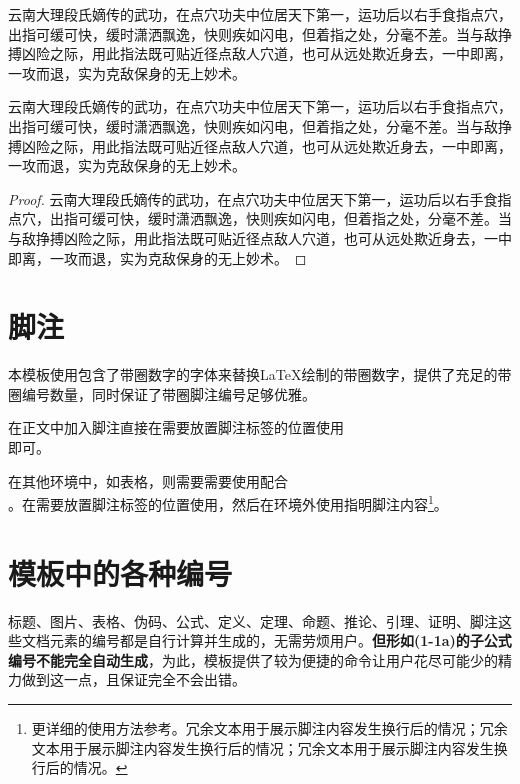 \documentclass[print, doctor, vlined]{DissertUESTC}
\begin{document}
	\begin{corollary}
		云南大理段氏嫡传的武功，在点穴功夫中位居天下第一，运功后以右手食指点穴，出指可缓可快，缓时潇洒飘逸，快则疾如闪电，但着指之处，分毫不差。当与敌挣搏凶险之际，用此指法既可贴近径点敌人穴道，也可从远处欺近身去，一中即离，一攻而退，实为克敌保身的无上妙术。
	\end{corollary}
	
	\begin{lemma}
		云南大理段氏嫡传的武功，在点穴功夫中位居天下第一，运功后以右手食指点穴，出指可缓可快，缓时潇洒飘逸，快则疾如闪电，但着指之处，分毫不差。当与敌挣搏凶险之际，用此指法既可贴近径点敌人穴道，也可从远处欺近身去，一中即离，一攻而退，实为克敌保身的无上妙术。
	\end{lemma}
	
	\begin{proof}
		云南大理段氏嫡传的武功，在点穴功夫中位居天下第一，运功后以右手食指点穴，出指可缓可快，缓时潇洒飘逸，快则疾如闪电，但着指之处，分毫不差。当与敌挣搏凶险之际，用此指法既可贴近径点敌人穴道，也可从远处欺近身去，一中即离，一攻而退，实为克敌保身的无上妙术。
	\end{proof}
	
	
	\section{脚注}
	
	本模板使用包含了带圈数字的字体来替换LaTeX绘制的带圈数字，提供了充足的带圈编号数量，同时保证了带圈脚注编号足够优雅。
	
	在正文中加入脚注直接在需要放置脚注标签的位置使用\\即可。
	
	在其他环境中，如表格，则需要需要使用配合\\。在需要放置脚注标签的位置使用，然后在环境外使用指明脚注内容\footnote{更详细的使用方法参考\href{https://blog.csdn.net/xovee/article/details/127563209}{}。冗余文本用于展示脚注内容发生换行后的情况；冗余文本用于展示脚注内容发生换行后的情况；冗余文本用于展示脚注内容发生换行后的情况。}。
	
	
	\section{模板中的各种编号}
	
	标题、图片、表格、伪码、公式、定义、定理、命题、推论、引理、证明、脚注这些文档元素的编号都是自行计算并生成的，无需劳烦用户。\textbf{但形如(1-1a)的子公式编号不能完全自动生成}，为此，模板提供了较为便捷的命令让用户花尽可能少的精力做到这一点，且保证完全不会出错。
	
\end{document}
